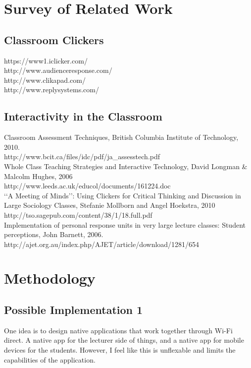 \documentclass{article}
\begin{document}
\section{Survey of Related Work}

\subsection{Classroom Clickers}

https://www1.iclicker.com/\\
http://www.audienceresponse.com/\\
http://www.clikapad.com/\\
http://www.replysystems.com/

\subsection{Interactivity in the Classroom}

Classroom Assessment Techniques, British Columbia Institute of Technology, 2010.\\
http://www.bcit.ca/files/idc/pdf/ja\_assesstech.pdf\\
Whole Class Teaching Strategies and Interactive Technology, David Longman \& Malcolm Hughes, 2006\\
http://www.leeds.ac.uk/educol/documents/161224.doc\\
‘‘A Meeting of Minds’’: Using Clickers for Critical Thinking and Discussion in Large Sociology Classes, Stefanie Mollborn and Angel Hoekstra, 2010\\
http://tso.sagepub.com/content/38/1/18.full.pdf\\
Implementation of personal response units in very large lecture classes: Student perceptions, John Barnett, 2006.\\
http://ajet.org.au/index.php/AJET/article/download/1281/654

\section{Methodology}

\subsection{Possible Implementation 1}
One idea is to design native applications that work together through Wi-Fi direct. A native app for the lecturer side of things, and a native app for mobile devices for the students. However, I feel like this is unflexable and limits the capabilities of the application. 
\end{document}
